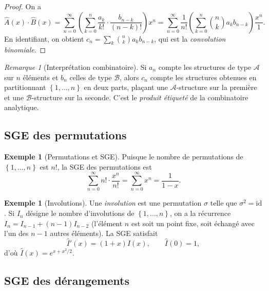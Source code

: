 \documentclass[12pt,a4paper,openany]{book}
\theoremstyle{definition}
\newtheorem{exemple}[definition]{Exemple}
\theoremstyle{plain}
\theoremstyle{remark}
\newtheorem{remarque}[definition]{Remarque}
\newcommand{\set}[1]{\left\{#1\right\}}
\begin{document}
\begin{proof}
On a
\[
  \hat{A}(x) \cdot \hat{B}(x)
    = \sum_{n=0}^{\infty} \left(\sum_{k=0}^{n} \frac{a_k}{k!} \cdot \frac{b_{n-k}}{(n-k)!}\right) x^n
    = \sum_{n=0}^{\infty} \frac{1}{n!} \left(\sum_{k=0}^{n} \binom{n}{k} a_k b_{n-k}\right) \frac{x^n}{1}.
\]
En identifiant, on obtient $c_n = \sum_k \binom{n}{k} a_k b_{n-k}$, qui est
la \emph{convolution binomiale}.
\end{proof}

\begin{remarque}[Interprétation combinatoire]
\label{rem:egf-produit-interpretation}
Si $a_n$ compte les structures de type $\mathcal{A}$ sur $n$ éléments et $b_n$
celles de type $\mathcal{B}$, alors $c_n$ compte les structures obtenues en
partitionnant $\set{1,\dots,n}$ en deux parts, plaçant une $\mathcal{A}$-structure
sur la première et une $\mathcal{B}$-structure sur la seconde. C'est le
\emph{produit étiqueté} de la combinatoire analytique.
\end{remarque}

\subsection{SGE des permutations}
\label{sec:egf-permutations}

\begin{exemple}[Permutations et SGE]
\label{ex:egf-permutations}
Puisque le nombre de permutations de $\set{1,\dots,n}$ est $n!$,
la SGE des permutations est
\[
  \sum_{n=0}^{\infty} n! \cdot \frac{x^n}{n!} = \sum_{n=0}^{\infty} x^n = \frac{1}{1-x}.
\]
\end{exemple}

\begin{exemple}[Involutions]
\label{ex:egf-involutions}
Une \emph{involution} est une permutation $\sigma$ telle que $\sigma^2 = \mathrm{id}$.
Si $I_n$ désigne le nombre d'involutions de $\set{1,\dots,n}$, on a la récurrence
$I_n = I_{n-1} + (n-1)I_{n-2}$ (l'élément $n$ est soit un point fixe, soit
échangé avec l'un des $n-1$ autres éléments). La SGE satisfait
\[
  \hat{I}'(x) = (1+x)\hat{I}(x), \qquad \hat{I}(0) = 1,
\]
d'où $\hat{I}(x) = e^{x + x^2/2}$.
\end{exemple}

\subsection{SGE des dérangements}
\label{sec:egf-derangements}
\end{document}
